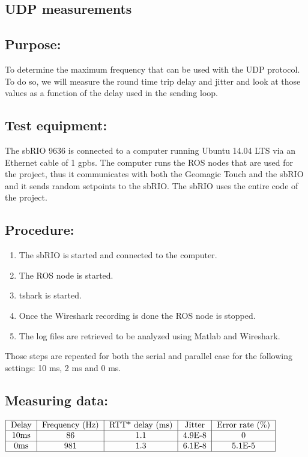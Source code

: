 \subsection{UDP measurements}\label{sec_udp_mes}

\subsection*{Purpose:}

To determine the maximum frequency that can be used with the UDP protocol. To do so, we will measure the round time trip delay and jitter and look at those values as a function of the delay used in the sending loop.

\subsection*{Test equipment:}

The sbRIO 9636 is connected to a computer running Ubuntu 14.04 LTS via an Ethernet cable of 1 gpbs. The computer runs the ROS nodes that are used for the project, thus it communicates with both the Geomagic Touch and the sbRIO and it sends random setpoints to the sbRIO. The sbRIO uses the entire code of the project.

\subsection*{Procedure:}

\begin{enumerate}
	\item The sbRIO is started and connected to the computer.
	\item The ROS node is started.
	\item tshark is started.%
	\item Once the Wireshark recording is done the ROS node is stopped.
	\item The log files are retrieved to be analyzed using Matlab and Wireshark.
\end{enumerate}
Those steps are repeated for both the serial and parallel case for the following settings: 10 ms, 2 ms and 0 ms.


\subsection*{Measuring data:}

\begin{center}
  $\begin{tabular}{|c|c|c|c|c|c|}
    \hline
    \text{Delay} & \text{Frequency (Hz)} & \text{RTT* delay (ms)} & \text{Jitter} & \text{Error rate (\%)}\\
    \hline
    10ms & 86 & 1.1 & 4.9E-8 & 0 \\
    \hline
    0ms & 981 & 1.3 & 6.1E-8 & 5.1E-5 \\
    \hline
  \end{tabular}$
\end{center}{}

